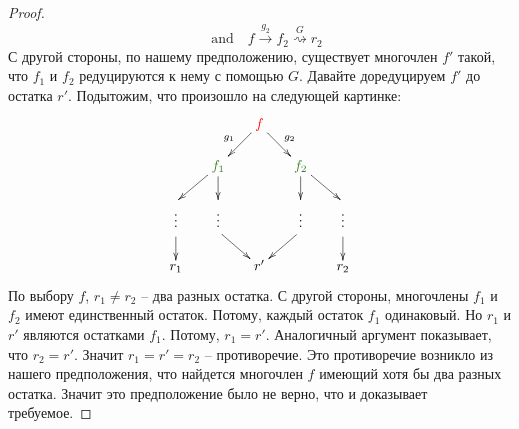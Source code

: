 \begin{proof}
\[\quad\text{and}\quad
f  \stackrel{g_2}{\longrightarrow}f_2  \stackrel{G}{\rightsquigarrow} r_2
\]
С другой стороны, по нашему предположению, существует многочлен $f'$ такой, что $f_1$ и $f_2$ редуцируются к нему с помощью $G$.
Давайте доредуцируем $f'$ до остатка $r'$.
Подытожим, что произошло на следующей картинке:
\[
\xymatrix@R=15pt@C=15pt{
	{}&{}&{\textcolor{red}{f}}\ar[dl]_{g_1}\ar[dr]^{g_2}&{}&{}\\
	{}&{\textcolor{OliveGreen}{f_1}}\ar[dl]\ar[d]&{}&{\textcolor{OliveGreen}{f_2}}\ar[d]\ar[dr]&{}\\
	{}\ar@{}[d]|{\vdots}&{}\ar@{}[d]|{\vdots}&{}&{}\ar@{}[d]|{\vdots}&{}\ar@{}[d]|{\vdots}\\
	{}\ar[d]&{}\ar[dr]&{}&{}\ar[dl]&{}\ar[d]\\
	{r_1}&{}&{r'}&{}&{r_2}\\
}
\]
По выбору $f$, $r_1 \neq r_2$ -- два разных остатка.
С другой стороны, многочлены $f_1$ и $f_2$ имеют единственный остаток.
Потому, каждый остаток $f_1$ одинаковый.
Но $r_1$ и $r'$ являются остатками $f_1$.
Потому, $r_1 = r'$.
Аналогичный аргумент показывает, что $r_2 = r'$.
Значит $r_1 = r' = r_2$ -- противоречие.
Это противоречие возникло из нашего предположения, что найдется многочлен $f$ имеющий хотя бы два разных остатка.
Значит это предположение было не верно, что и доказывает требуемое.
\end{proof}

